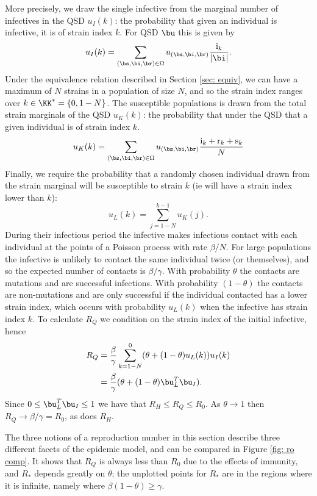 \documentclass[smallextended]{svjour3}       %
\begin{document}
More precisely, we draw the single infective from the marginal number of infectives in the QSD $u_I(k)$: the probability that given an individual is infective, it is of strain index $k$. For QSD $\bu$ this is given by 
\[
	u_I(k) = \sum_{(\bs,\bi,\br) \in \Omega} u_{(\bs,\bi,\br)} \frac{{\rm i}_k }{ |\bi| }.
\]
Under the equivalence relation described in Section \ref{sec: equiv}, we can have a maximum of $N$ strains in a population of size $N$, and so the strain index ranges over $k \in \KK^* = \{0, 1-N\}$. The susceptible populations is drawn from the total strain marginals of the QSD $u_K(k)$: the probability that under the QSD that a given individual is of strain index $k$. 
\[
	u_K(k) = \sum_{(\bs,\bi,\br) \in \Omega} u_{(\bs,\bi,\br)} \frac{\textrm{i}_k + \textrm{r}_k + \textrm{s}_k}{N} 
\]
Finally, we require the probability that a randomly chosen individual drawn from the strain marginal will be susceptible to strain $k$ (ie will have a strain index lower than $k$):
\[u_L(k) = \sum_{j=1-N}^{k-1}u_K(j).\] 
During their infectious period the infective makes infectious contact with each individual at the points of a Poisson process with rate $\beta/N$. For large populations the infective is unlikely to contact the same individual twice (or themselves), and so the expected number of contacts is $\beta/\gamma$. With probability $\theta$ the contacts are mutations and are successful infections. With probability $(1-\theta)$ the contacts are non-mutations and are only successful if the individual contacted has a lower strain index, which occurs with probability $u_L(k)$ when the infective has strain index $k$. To calculate $R_Q$ we condition on the strain index of the initial infective, hence
\begin{align}\label{eqn: rq}
R_Q&=\frac{\beta}{\gamma}\sum\limits_{k=1-N}^{0}(\theta + (1-\theta)u_L(k))u_I(k)\nonumber\\
&=\frac{\beta}{\gamma}(\theta+(1-\theta)\bu_L^T\bu_I).
\end{align}  
Since $0\leq\bu_L^T\bu_I\leq1$ we have that $R_H\leq R_Q\leq R_0$. As $\theta \rightarrow 1$ then $R_Q\rightarrow\beta/\gamma=R_0$, as does $R_H$. 

The three notions of a reproduction number in this section describe three different facets of the epidemic model, and can be compared in Figure \ref{fig: ro comp}. It shows that $R_Q$ is always less than $R_0$ due to the effects of immunity, and $R_*$ depends greatly on $\theta$; the unplotted points for $R_*$ are in the regions where it is infinite, namely where $\beta(1-\theta) \geq \gamma$.
\end{document}
